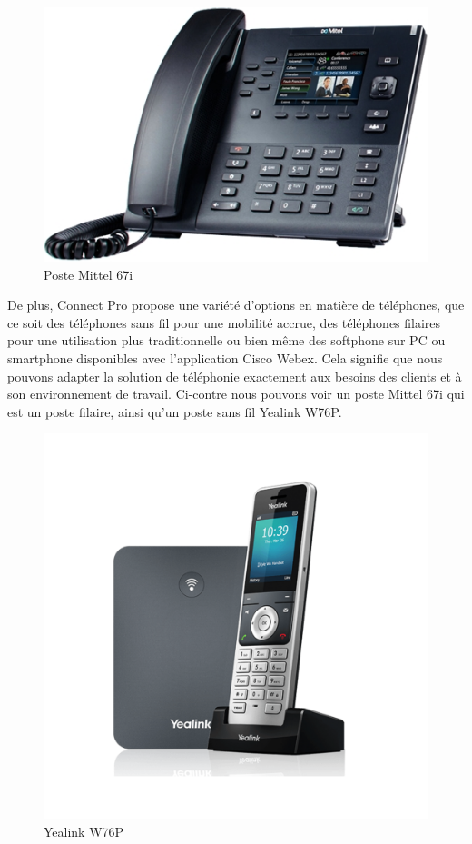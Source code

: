 \documentclass[12pt, a4paper]{article}
\begin{document}
\newpage
\begingroup
\setlength{\intextsep}{0pt}
\begin{figure}
	\includegraphics[scale=.5]{img/mittel.jpg}
	\caption{Poste Mittel 67i}
\end{figure}
De plus, Connect Pro propose une variété
d'options en matière de téléphones, que
ce soit des téléphones sans fil pour
une mobilité accrue, des téléphones
filaires pour une utilisation plus
traditionnelle ou bien même des softphone 
sur PC ou smartphone disponibles avec 
l'application Cisco Webex. Cela signifie que nous pouvons
adapter la solution de téléphonie exactement aux besoins
des clients et à son environnement de travail.
Ci-contre nous pouvons voir un poste Mittel 67i
qui est un poste filaire, ainsi qu'un poste sans fil
Yealink W76P.\\
\begin{figure}
	\includegraphics[scale=.6]{img/yealink.png}
	\caption{Yealink W76P}
\end{figure}
\end{document}
